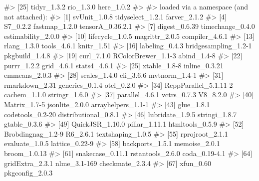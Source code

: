 \documentclass[
  italian,
  letterpaper,
  a4paper,
  11pt,
  open=any]{scrbook}
\newenvironment{Shaded}{\begin{snugshade}}{\end{snugshade}}
\newcommand{\CommentTok}[1]{\textcolor[rgb]{0.37,0.37,0.37}{#1}}
\theoremstyle{plain}
\theoremstyle{definition}
\theoremstyle{definition}
\theoremstyle{remark}
\begin{document}
\begin{tcolorbox}
\begin{Shaded}
\begin{Highlighting}[]
\CommentTok{\#\textgreater{} [25] tidyr\_1.3.2           rio\_1.3.0             here\_1.0.2           }
\CommentTok{\#\textgreater{} }
\CommentTok{\#\textgreater{} loaded via a namespace (and not attached):}
\CommentTok{\#\textgreater{}  [1] svUnit\_1.0.8          tidyselect\_1.2.1      farver\_2.1.2         }
\CommentTok{\#\textgreater{}  [4] S7\_0.2.2              fastmap\_1.2.0         tensorA\_0.36.2.1     }
\CommentTok{\#\textgreater{}  [7] digest\_0.6.39         timechange\_0.4.0      estimability\_2.0.0   }
\CommentTok{\#\textgreater{} [10] lifecycle\_1.0.5       magrittr\_2.0.5        compiler\_4.6.1       }
\CommentTok{\#\textgreater{} [13] rlang\_1.3.0           tools\_4.6.1           knitr\_1.51           }
\CommentTok{\#\textgreater{} [16] labeling\_0.4.3        bridgesampling\_1.2{-}1  pkgbuild\_1.4.8       }
\CommentTok{\#\textgreater{} [19] curl\_7.1.0            RColorBrewer\_1.1{-}3    abind\_1.4{-}8          }
\CommentTok{\#\textgreater{} [22] purrr\_1.2.2           grid\_4.6.1            stats4\_4.6.1         }
\CommentTok{\#\textgreater{} [25] xtable\_1.8{-}8          inline\_0.3.21         emmeans\_2.0.3        }
\CommentTok{\#\textgreater{} [28] scales\_1.4.0          cli\_3.6.6             mvtnorm\_1.4{-}1        }
\CommentTok{\#\textgreater{} [31] rmarkdown\_2.31        generics\_0.1.4        otel\_0.2.0           }
\CommentTok{\#\textgreater{} [34] RcppParallel\_5.1.11{-}2 cachem\_1.1.0          stringr\_1.6.0        }
\CommentTok{\#\textgreater{} [37] parallel\_4.6.1        vctrs\_0.7.3           V8\_8.2.0             }
\CommentTok{\#\textgreater{} [40] Matrix\_1.7{-}5          jsonlite\_2.0.0        arrayhelpers\_1.1{-}1   }
\CommentTok{\#\textgreater{} [43] glue\_1.8.1            codetools\_0.2{-}20      distributional\_0.8.1 }
\CommentTok{\#\textgreater{} [46] lubridate\_1.9.5       stringi\_1.8.7         gtable\_0.3.6         }
\CommentTok{\#\textgreater{} [49] QuickJSR\_1.10.0       pillar\_1.11.1         htmltools\_0.5.9      }
\CommentTok{\#\textgreater{} [52] Brobdingnag\_1.2{-}9     R6\_2.6.1              textshaping\_1.0.5    }
\CommentTok{\#\textgreater{} [55] rprojroot\_2.1.1       evaluate\_1.0.5        lattice\_0.22{-}9       }
\CommentTok{\#\textgreater{} [58] backports\_1.5.1       memoise\_2.0.1         broom\_1.0.13         }
\CommentTok{\#\textgreater{} [61] snakecase\_0.11.1      rstantools\_2.6.0      coda\_0.19{-}4.1        }
\CommentTok{\#\textgreater{} [64] gridExtra\_2.3.1       nlme\_3.1{-}169          checkmate\_2.3.4      }
\CommentTok{\#\textgreater{} [67] xfun\_0.60             pkgconfig\_2.0.3}
\end{Highlighting}
\end{Shaded}

\end{tcolorbox}
\end{document}
